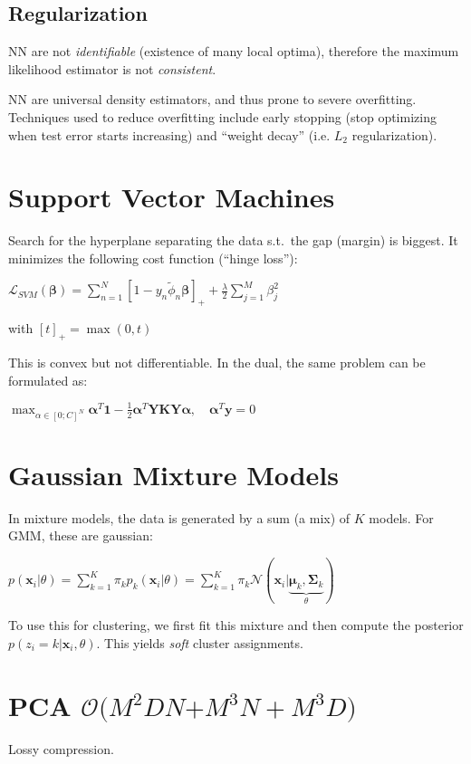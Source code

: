 \documentclass[10pt,a4paper,landscape]{article}
\renewcommand{\bf}[1]{\ensuremath{\mathbf{#1}}}
\newcommand{\balpha}{\boldsymbol\alpha}
\newcommand{\bbeta}{\boldsymbol\beta}
\newcommand{\st}{s.t.}
\begin{document}
\begin{multicols*}{4}
\subsection{Regularization}
NN are not \textit{identifiable} (existence of many local optima), therefore the maximum likelihood estimator is not \textit{consistent}.

NN are universal density estimators, and thus prone to severe overfitting. Techniques used to reduce overfitting include early stopping (stop optimizing when test error starts increasing) and ``weight decay'' (i.e. $L_2$ regularization).

\section{Support Vector Machines}
Search for the hyperplane separating the data \st\ the gap (margin) is biggest.
It minimizes the following cost function (``hinge loss''):

$\mathcal{L}_{SVM} (\bbeta)= \sum_{n=1}^N [1 - y_n \tilde\phi_n \bbeta]_{+} + \frac{\lambda}{2} \sum_{j=1}^M \beta_j^2$

with $[t]_{+} = \max(0, t)$

This is convex but not differentiable. In the dual, the same problem can be formulated as:

$\max_{\alpha \in [0; C]^N} \balpha^T \bf{1} - \frac{1}{2} \balpha^T \bf{Y K Y} \balpha , \quad \balpha^T \bf{y} = 0$

\section{Gaussian Mixture Models}
In mixture models, the data is generated by a sum (a mix) of $K$ models. For GMM, these are gaussian:

$p(\bf{x}_i | \theta) = \sum_{k=1}^K \pi_k p_k(\bf{x}_i | \theta) =  \sum_{k=1}^K \pi_k \mathcal{N}(\bf{x}_i | \underbrace{\bf{\mu}_k, \bf{\Sigma}_k}_{\theta})$

To use this for clustering, we first fit this mixture and then compute the posterior $p(z_i = k | \bf{x}_i, \theta)$. This yields \textit{soft} cluster assignments.

\section{PCA \small $\mathcal{O}(M^2DN$\tiny$+M^3N+M^3D$\small$)$}
Lossy compression.


\end{multicols*}
\end{document}
